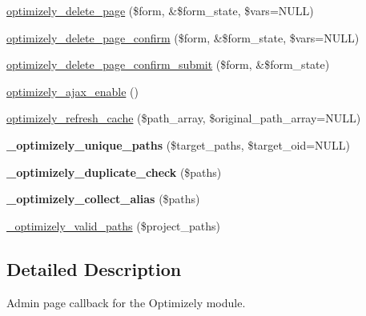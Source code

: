 \begin{DoxyCompactItemize}
\item 
\hyperlink{optimizely_8admin_8inc_add00991770834a3d58f001f83dfdd28c}{optimizely\_\-delete\_\-page} (\$form, \&\$form\_\-state, \$vars=NULL)
\item 
\hyperlink{optimizely_8admin_8inc_add000bbe43a0d21f9521fe292cd81d65}{optimizely\_\-delete\_\-page\_\-confirm} (\$form, \&\$form\_\-state, \$vars=NULL)
\item 
\hyperlink{optimizely_8admin_8inc_aa159c6fba81a52d6b39438ea4739ead4}{optimizely\_\-delete\_\-page\_\-confirm\_\-submit} (\$form, \&\$form\_\-state)
\item 
\hyperlink{optimizely_8admin_8inc_ab7a52ffd4af3ee7365abfbd565aded63}{optimizely\_\-ajax\_\-enable} ()
\item 
\hyperlink{optimizely_8admin_8inc_a7b0f4a56fbd620d68ed8e62661ad47d2}{optimizely\_\-refresh\_\-cache} (\$path\_\-array, \$original\_\-path\_\-array=NULL)
\item 
\hypertarget{optimizely_8admin_8inc_a7f6fbfeac6d5ac7edaa4c1608032a21f}{
{\bfseries \_\-optimizely\_\-unique\_\-paths} (\$target\_\-paths, \$target\_\-oid=NULL)}
\label{optimizely_8admin_8inc_a7f6fbfeac6d5ac7edaa4c1608032a21f}

\item 
\hypertarget{optimizely_8admin_8inc_ae1cad642b2c03200e785dd90fce113b0}{
{\bfseries \_\-optimizely\_\-duplicate\_\-check} (\$paths)}
\label{optimizely_8admin_8inc_ae1cad642b2c03200e785dd90fce113b0}

\item 
\hypertarget{optimizely_8admin_8inc_a39e91a3cf55c338503c9eea80fe414b4}{
{\bfseries \_\-optimizely\_\-collect\_\-alias} (\$paths)}
\label{optimizely_8admin_8inc_a39e91a3cf55c338503c9eea80fe414b4}

\item 
\hyperlink{optimizely_8admin_8inc_a78118fa72426111d4861e98386e3192d}{\_\-optimizely\_\-valid\_\-paths} (\$project\_\-paths)
\end{DoxyCompactItemize}


\subsection{Detailed Description}
Admin page callback for the Optimizely module. 

